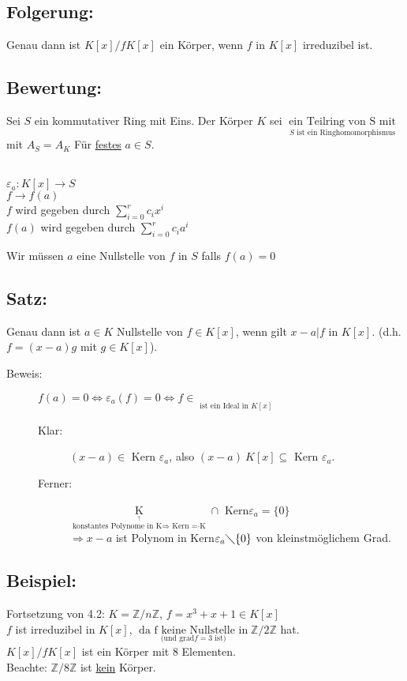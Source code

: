 \subsection{Folgerung:}
Genau dann ist $K[x]/fK[x]$ ein Körper, wenn $f$ in $K[x]$ irreduzibel ist.
%
%
%
\subsection{Bewertung:}
Sei $S$ ein kommutativer Ring mit Eins. Der Körper $K$ sei $\mathop{\text{ein Teilring von $S$ mit}}\limits_{S\text{ ist ein Ringhomomorphismus}}$ mit $A_{S} = A_{K}$ Für \underline{festes} $a \in S$. \\
\qquad\\
\begin{centering}
$\varepsilon_{a} : K[x] \longrightarrow S$\\
$f \longrightarrow f(a)$\\
$f$ wird gegeben durch $\sum\limits^{r}_{i=0}c_{i}x^{i}$\\
$f(a)$ wird gegeben durch $\sum\limits^{r}_{i=0}c_{i}a^{i}$\\
\end{centering}
Wir müssen $a$ eine Nullstelle von $f$ in $S$ falls $f(a)=0$
%
%
%
\subsection{Satz:}
Genau dann ist $a \in K$ Nullstelle von $f \in K[x]$, wenn gilt $x-a|f$ in $K[x]$. (d.h. $f=(x-a)g$ mit $g \in K[x]$).
\begin{description}
	\item[Beweis:] $f(a) = 0 \Leftrightarrow \varepsilon_{a}(f)=0 \Leftrightarrow f \in \mathop{\underbrace{\text{ Kern} 
				\in a}}\limits_{\text{ist ein Ideal in }K[x]}$
	\begin{description}
		\item[Klar:] $(x-a) \in$ Kern $\varepsilon_{a}$, also $(x-a) \ K[x] \subseteq$ Kern $\varepsilon_{a}$.
		\item[Ferner:] $\mathop{K}\limits_{\mathop{\text{konstantes Polynome in } K[x] \Rightarrow \text{ Kern 
					}\varepsilon_{a}=(x-a) \cdot K[x]}\limits^{\uparrow}} \cap$ Kern$\varepsilon_{a}=\{0\}$\\
					$\Rightarrow x-a$ ist Polynom in Kern$\varepsilon_{a}\diagdown\{0\}$ von 
					kleinstmöglichem Grad.
	\end{description}
\end{description}
%
%
%
\subsection{Beispiel:}
Fortsetzung von 4.2: $K=\mathbb{Z}/n\mathbb{Z}$, \quad $f=x^{3}+x+1 \in K[x]$ \\
$f$ ist irreduzibel in $K[x]$, $\mathop{\text{da }f\text{ keine Nullstelle in }}\limits_{\text{(und grad}f=3\text{ ist)}}\mathbb{Z}/2\mathbb{Z}$ hat.\\
$K[x]/fK[x]$ ist ein Körper mit 8 Elementen.\\
Beachte: $\mathbb{Z}/8\mathbb{Z}$ ist \underline{kein} Körper. 
%
%
%

